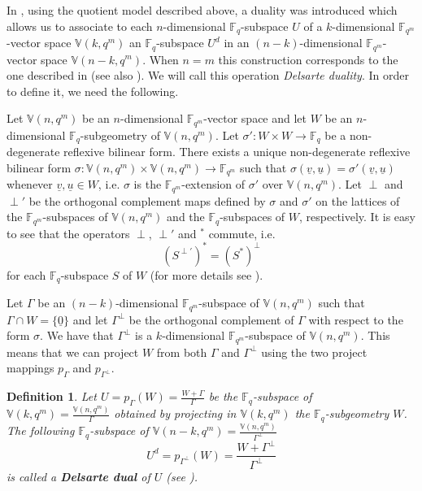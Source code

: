 \documentclass[11pt]{amsart}
\newtheorem{definition}[theorem]{Definition}
\newcommand{\fqm}{\mathbb{F}_{q^m}}
\newcommand{\F}{{\mathbb F}}
\newcommand{\fq}{{\mathbb F}_{q}}
\begin{document}
In \cite{csajbok2021generalising}, using the quotient model described above, a duality was introduced which allows us to associate to each $n$-dimensional $\fq$-subspace $U$ of a $k$-dimensional $\fqm$-vector space $\mathbb{V}(k,q^m)$  an $\fq$-subspace $U^d$ in an $(n-k)$-dimensional  $\fqm$-vector space $\mathbb{V}(n-k,q^m)$. When $n=m$ this construction corresponds to the one described in \cite[Theorem 4.6]{sheekeyVdV}  (see also \cite{lunardon2017mrd}).
We will call this operation \emph{Delsarte duality}. In order to define it, we need the following.

Let $\mathbb{V}(n,q^m)$ be an $n$-dimensional $\fqm$-vector space and let $W$ be an $n$-dimensional $\fq$-subgeometry  of $\mathbb{V}(n,q^m)$.   Let $\sigma': W\times W\longrightarrow \fq$ be a non-degenerate
reflexive bilinear form. There exists a unique non-degenerate reflexive bilinear form  $\sigma: \mathbb{V}(n,q^m)\times \mathbb{V}(n,q^m)\longrightarrow \fqm$ such that $\sigma (\underline{v}, \underline{u} )= \sigma' (\underline{v}, \underline{u})$ whenever $\underline{v}, \underline{u} \in W$, i.e. $\sigma$ is the $\fqm$-extension of $\sigma'$ over $\mathbb{V}(n,q^m)$.  Let $\perp$ and $\perp'$ be the orthogonal complement maps
defined by $\sigma$ and $\sigma'$ on the lattices of the
$\F_{q^m}$-subspaces of $\mathbb{V}(n,q^m)$ and the $\F_{q}$-subspaces of $W$, respectively.  It is easy to
see that the operators $\perp$, $\perp'$ and $^*$ commute, i.e. 
\begin{equation}\label{eq:*perp}
    (S^{\perp'})^*=(S^*)^{\perp}
\end{equation}
for each $\F_{q}$-subspace $S$ of
$W$ (for more details see \cite[Section 3]{csajbok2021generalising}).

Let $\Gamma$ be an $(n-k)$-dimensional $\fqm$-subspace of $\mathbb{V}(n,q^m)$ such that $\Gamma \cap W=\{ \underline 0\}$ and let $\Gamma^\perp$ be the orthogonal complement of $\Gamma$ with respect to the form $\sigma$. We have that $\Gamma^\perp$ is a $k$-dimensional $\fqm$-subspace of $\mathbb{V}(n,q^m)$.  
This means that we can project $W$ from both $\Gamma$ and $\Gamma^\perp$ using the two project mappings $p_{\Gamma}$ and $p_{\Gamma^\perp}$.


\begin{definition}
Let $U=p_{\Gamma}(W)=\frac{W+\Gamma}{\Gamma}$ be the $\fq$-subspace of $\mathbb{V}(k,q^m)=\frac{\mathbb{V}(n,q^m)}{\Gamma}$ obtained by projecting in $\mathbb{V}(k,q^m)$ the $\fq$-subgeometry  $W$. The following $\fq$-subspace of  $\mathbb{V}(n-k,q^m)=\frac{\mathbb{V}(n,q^m)}{\Gamma^\perp}$ 
\begin{equation} \label{Delsarte dual}
U^d=p_{\Gamma^\perp}(W)=\frac{W+\Gamma^\perp}{\Gamma^\perp}
\end{equation}
 is called a \textbf{Delsarte dual} of $U$ (see \cite[Definition 3.2]{csajbok2021generalising}).
\end{definition}
\end{document}
